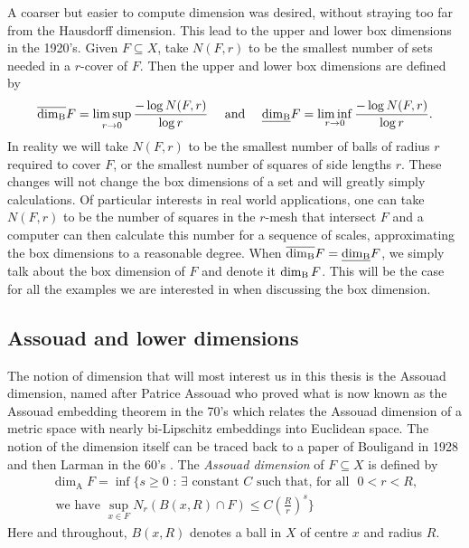 A coarser but easier to compute dimension was desired, without straying too far from the Hausdorff dimension. This lead to the upper and lower box dimensions in the 1920's. Given $F\subseteq X$, take $N(F,r)$ to be the smallest number of sets needed in a $r$-cover of $F$. Then the upper and lower box dimensions are defined by
\[
\overline{\dim_{\textup{B}}} F = \limsup_{r \rightarrow 0} \frac{-\log N(F,r)}{\log r}   \quad \text{ and } \quad \underline{\dim_{\textup{B}}} F = \liminf_{r \rightarrow 0} \frac{-\log N(F,r)}{\log r}. 
\]
In reality we will take $N(F,r)$ to be the smallest number of balls of radius $r$ required to cover $F$, or the smallest number of squares of side lengths $r$. These changes will not change the box dimensions of a set and will greatly simply calculations. Of particular interests in real world applications, one can take $N(F,r)$ to be the number of squares in the $r$-mesh that intersect $F$ and a computer can then calculate this number for a sequence of scales, approximating the box dimensions to a reasonable degree. When $\overline{\dim_{\textup{B}}} F = \underline{\dim_{\textup{B}}} F$, we simply talk about the box dimension of $F$ and denote it $\dim_{\textup{B}} F$. This will be the case for all the examples we are interested in when discussing the box dimension. 




\subsection{Assouad and lower dimensions}
\label{sec:intro-ass}

The notion of dimension that will most interest us in this thesis is the Assouad dimension, named after Patrice Assouad who proved what is now known as the Assouad embedding theorem in the 70's \cite{assouad1, assouad2} which relates the Assouad dimension of a metric space with nearly bi-Lipschitz embeddings into Euclidean space. The notion of the dimension itself can be traced back to a paper of Bouligand in 1928 \cite{bouligand} and then Larman in the 60's \cite{larman1,larman2}. The \textit{Assouad dimension} of $F \subseteq X$ is defined by 
\begin{multline*}
\dim_{\text{A}} F = \inf \Bigg\{ s \geq 0 \, \,  : \, \exists \text{ constant } C \text{ such that, for all } \, \, 0< r< R,\\ \text{ we have  }\sup_{x\in F} N_r (B(x,R)\cap F) \leq C\left(\frac{R}{r}\right)^{s} \Bigg\}
\end{multline*}
Here and throughout, $B(x,R)$ denotes a ball in $X$ of centre $x$ and radius $R$.

